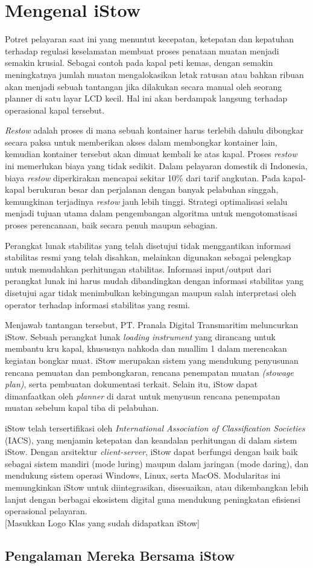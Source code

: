 \chapter{Mengenal iStow}
\label{ch:mengenal-iStow}


Potret pelayaran saat ini yang menuntut kecepatan, ketepatan dan kepatuhan terhadap regulasi keselamatan membuat proses penataan muatan menjadi semakin krusial. Sebagai contoh pada kapal peti kemas, dengan semakin meningkatnya jumlah muatan mengalokasikan letak ratusan atau bahkan ribuan akan menjadi sebuah tantangan jika dilakukan secara manual oleh seorang planner di satu layar LCD kecil. Hal ini akan berdampak langsung terhadap operasional kapal tersebut.

{ \em Restow} adalah proses di mana sebuah kontainer harus terlebih dahulu dibongkar secara paksa untuk memberikan akses dalam membongkar kontainer lain, kemudian kontainer tersebut akan dimuat kembali ke atas kapal. Proses {\em restow} ini memerlukan biaya yang tidak sedikit. Dalam pelayaran domestik di Indonesia, biaya {\em restow} diperkirakan mencapai sekitar 10\% dari tarif angkutan. Pada kapal-kapal berukuran besar dan perjalanan dengan banyak pelabuhan singgah, kemungkinan terjadinya {\em restow} jauh lebih tinggi. Strategi optimalisasi selalu menjadi tujuan utama dalam pengembangan algoritma untuk mengotomatisasi proses perencanaan, baik secara penuh maupun sebagian.

Perangkat lunak stabilitas yang telah disetujui tidak menggantikan informasi stabilitas resmi yang telah disahkan, melainkan digunakan sebagai pelengkap untuk memudahkan perhitungan stabilitas. Informasi input/output dari perangkat lunak ini harus mudah dibandingkan dengan informasi stabilitas yang disetujui agar tidak menimbulkan kebingungan maupun salah interpretasi oleh operator terhadap informasi stabilitas yang resmi.

Menjawab tantangan tersebut, PT. Pranala Digital Transmaritim meluncurkan iStow. Sebuah perangkat lunak {\em loading instrument} yang dirancang untuk membantu kru kapal, khususnya nahkoda dan muallim 1 dalam merencakan kegiatan bongkar muat. iStow merupakan sistem yang mendukung penyusunan rencana pemuatan dan pembongkaran, rencana penempatan muatan {\em(stowage plan)}, serta pembuatan dokumentasi terkait. Selain itu, iStow dapat dimanfaatkan oleh {\em planner} di darat untuk menyusun rencana penempatan muatan sebelum kapal tiba di pelabuhan.

iStow telah tersertifikasi  oleh {\em International Association of Classification Societies} (IACS), yang menjamin ketepatan dan keandalan perhitungan di dalam sistem iStow. Dengan arsitektur {\em client-server}, iStow dapat berfungsi dengan baik baik sebagai sistem mandiri (mode luring) maupun dalam jaringan (mode daring), dan mendukung sistem operasi Windows, Linux, serta MacOS. Modularitas ini memungkinkan iStow untuk diintegrasikan, disesuaikan, atau dikembangkan lebih lanjut dengan berbagai ekosistem digital guna mendukung peningkatan efisiensi operasional pelayaran.\\

\centering
{[Masukkan Logo Klas yang sudah didapatkan iStow]}\\

\section{Pengalaman Mereka Bersama iStow}
\label{sec:iStow-sebagai-solusi}